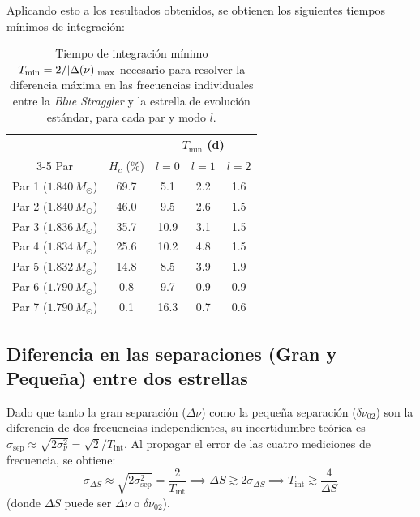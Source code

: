 Aplicando esto a los resultados obtenidos, se obtienen los siguientes tiempos mínimos de integración:

\begin{table}[H]
  \centering
  \begin{tabular}{
      c
      c
      c
      c
      c
    }
    \toprule
    & & \multicolumn{3}{c}{$T_{\min}$ (d)} \\
    \cmidrule(lr){3-5}
    {Par} & {$H_c$ (\%)} & {$l = 0$} & {$l = 1$} & {$l = 2$} \\
    \midrule
    Par 1 ($1.840\,M_\odot$) & 69.7 &  5.1 & 2.2 & 1.6 \\
    Par 2 ($1.840\,M_\odot$) & 46.0 &  9.5 & 2.6 & 1.5 \\
    Par 3 ($1.836\,M_\odot$) & 35.7 & 10.9 & 3.1 & 1.5 \\
    Par 4 ($1.834\,M_\odot$) & 25.6 & 10.2 & 4.8 & 1.5 \\
    Par 5 ($1.832\,M_\odot$) & 14.8 &  8.5 & 3.9 & 1.9 \\
    Par 6 ($1.790\,M_\odot$) &  0.8 &  9.7 & 0.9 & 0.9 \\
    Par 7 ($1.790\,M_\odot$) &  0.1 & 16.3 & 0.7 & 0.6 \\
    \bottomrule
  \end{tabular}
  \caption{Tiempo de integración mínimo $T_{\protect\min} = 2/|\Delta(\nu)|_{\protect\max}$ necesario para resolver la diferencia máxima en las frecuencias individuales entre la \textit{Blue Straggler} y la estrella de evolución estándar, para cada par y modo $l$.}
  \label{tab:tmin_indfreq}
\end{table}

\subsection{Diferencia en las separaciones (Gran y Pequeña) entre dos estrellas}

Dado que tanto la gran separación ($\Delta\nu$) como la pequeña separación ($\delta\nu_{02}$) son la diferencia de dos frecuencias independientes, su incertidumbre teórica es $\sigma_{\mathrm{sep}} \approx \sqrt{2 \sigma_\nu^2} = \sqrt{2}/T_{\mathrm{int}}$. Al propagar el error de las cuatro mediciones de frecuencia, se obtiene:
\begin{equation}
  \sigma_{\Delta S} \approx \sqrt{2 \sigma_{\mathrm{sep}}^2} = \frac{2}{T_{\mathrm{int}}} \implies \Delta S \gtrsim 2 \sigma_{\Delta S} \implies T_{\mathrm{int}} \gtrsim \frac{4}{\Delta S}
\end{equation}
(donde $\Delta S$ puede ser $\Delta \nu$ o $\delta\nu_{02}$).

